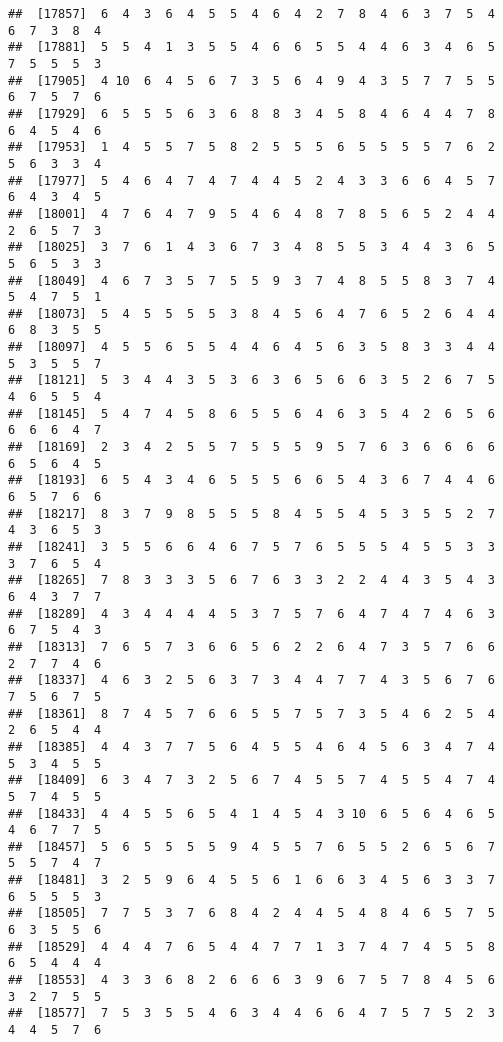 \documentclass[
]{book}
\begin{document}
\begin{verbatim}
##  [17857]  6  4  3  6  4  5  5  4  6  4  2  7  8  4  6  3  7  5  4  6  7  3  8  4
##  [17881]  5  5  4  1  3  5  5  4  6  6  5  5  4  4  6  3  4  6  5  7  5  5  5  3
##  [17905]  4 10  6  4  5  6  7  3  5  6  4  9  4  3  5  7  7  5  5  6  7  5  7  6
##  [17929]  6  5  5  5  6  3  6  8  8  3  4  5  8  4  6  4  4  7  8  6  4  5  4  6
##  [17953]  1  4  5  5  7  5  8  2  5  5  5  6  5  5  5  5  7  6  2  5  6  3  3  4
##  [17977]  5  4  6  4  7  4  7  4  4  5  2  4  3  3  6  6  4  5  7  6  4  3  4  5
##  [18001]  4  7  6  4  7  9  5  4  6  4  8  7  8  5  6  5  2  4  4  2  6  5  7  3
##  [18025]  3  7  6  1  4  3  6  7  3  4  8  5  5  3  4  4  3  6  5  5  6  5  3  3
##  [18049]  4  6  7  3  5  7  5  5  9  3  7  4  8  5  5  8  3  7  4  5  4  7  5  1
##  [18073]  5  4  5  5  5  5  3  8  4  5  6  4  7  6  5  2  6  4  4  6  8  3  5  5
##  [18097]  4  5  5  6  5  5  4  4  6  4  5  6  3  5  8  3  3  4  4  5  3  5  5  7
##  [18121]  5  3  4  4  3  5  3  6  3  6  5  6  6  3  5  2  6  7  5  4  6  5  5  4
##  [18145]  5  4  7  4  5  8  6  5  5  6  4  6  3  5  4  2  6  5  6  6  6  6  4  7
##  [18169]  2  3  4  2  5  5  7  5  5  5  9  5  7  6  3  6  6  6  6  6  5  6  4  5
##  [18193]  6  5  4  3  4  6  5  5  5  6  6  5  4  3  6  7  4  4  6  6  5  7  6  6
##  [18217]  8  3  7  9  8  5  5  5  8  4  5  5  4  5  3  5  5  2  7  4  3  6  5  3
##  [18241]  3  5  5  6  6  4  6  7  5  7  6  5  5  5  4  5  5  3  3  3  7  6  5  4
##  [18265]  7  8  3  3  3  5  6  7  6  3  3  2  2  4  4  3  5  4  3  6  4  3  7  7
##  [18289]  4  3  4  4  4  4  5  3  7  5  7  6  4  7  4  7  4  6  3  6  7  5  4  3
##  [18313]  7  6  5  7  3  6  6  5  6  2  2  6  4  7  3  5  7  6  6  2  7  7  4  6
##  [18337]  4  6  3  2  5  6  3  7  3  4  4  7  7  4  3  5  6  7  6  7  5  6  7  5
##  [18361]  8  7  4  5  7  6  6  5  5  7  5  7  3  5  4  6  2  5  4  2  6  5  4  4
##  [18385]  4  4  3  7  7  5  6  4  5  5  4  6  4  5  6  3  4  7  4  5  3  4  5  5
##  [18409]  6  3  4  7  3  2  5  6  7  4  5  5  7  4  5  5  4  7  4  5  7  4  5  5
##  [18433]  4  4  5  5  6  5  4  1  4  5  4  3 10  6  5  6  4  6  5  4  6  7  7  5
##  [18457]  5  6  5  5  5  5  9  4  5  5  7  6  5  5  2  6  5  6  7  5  5  7  4  7
##  [18481]  3  2  5  9  6  4  5  5  6  1  6  6  3  4  5  6  3  3  7  6  5  5  5  3
##  [18505]  7  7  5  3  7  6  8  4  2  4  4  5  4  8  4  6  5  7  5  6  3  5  5  6
##  [18529]  4  4  4  7  6  5  4  4  7  7  1  3  7  4  7  4  5  5  8  6  5  4  4  4
##  [18553]  4  3  3  6  8  2  6  6  6  3  9  6  7  5  7  8  4  5  6  3  2  7  5  5
##  [18577]  7  5  3  5  5  4  6  3  4  4  6  6  4  7  5  7  5  2  3  4  4  5  7  6

\end{verbatim}
\end{document}
